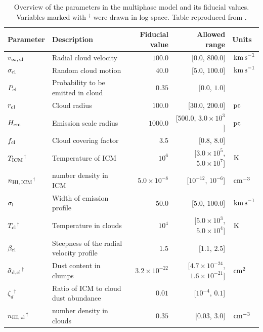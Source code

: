 \documentclass[a4,useAMS,usenatbib,usegraphicx]{mn2e}
\newcommand{\HI}{{\text{H\MakeUppercase{\romannumeral 1}}} }
\newcommand{\cm}{\ifmmode{{\rm cm}}\else cm\fi}
\begin{document}
\begin{table}
  \centering
\begin{tabular}{l|lrrl}
\hline
  Parameter  & Description & Fiducial value & Allowed range & Units \\ \hline\hline
$v_{\infty,\,{\rm cl}}$ & Radial cloud velocity & $100.0$ & [$0.0$, $800.0$] & $\,{\rm km\,s}^{-1}$ \\
$\sigma_{\rm {\rm cl}}$ & Random cloud motion &$40.0$ & [$5.0$, $100.0$] & $\,{\rm km\,s}^{-1}$ \\
$P_{\rm {\rm cl}}$ & Probability to be emitted in cloud & $0.35$ & [$0.0$, $1.0$] &  \\
$r_{\rm {\rm cl}}$ & Cloud radius & $100.0$ & [$30.0$, $200.0$] & $\,{\rm pc}$ \\
$H_{\rm em}$ & Emission scale radius & $1000.0$ & [$500.0$, $3.0\times 10^{3}$] & $\,{\rm pc}$ \\
$f_{\rm {\rm cl}}$ & Cloud covering factor & $3.5$ & [$0.8$, $8.0$] &  \\
$T_{\rm {\rm ICM}}$${}^{\dagger}$ & Temperature of ICM & $10^{6}$ & [$3.0\times 10^{5}$, $5.0\times 10^{7}$] & $\,{\rm K}$ \\
$n_{\rm HI,\,{\rm ICM}}$${}^{\dagger}$ & \HI number density in ICM & $5.0\times 10^{-8}$ & [$10^{-12}$, $10^{-6}$] & $\,{\rm cm}^{-3}$ \\
$\sigma_{\rm i}$ & Width of emission profile & $50.0$ & [$5.0$, $100.0$] & $\,{\rm km\,s}^{-1}$ \\
$T_{\rm {\rm cl}}$${}^{\dagger}$ & Temperature in clouds & $10^{4}$ & [$5.0\times 10^{3}$, $5.0\times 10^{4}$] & $\,{\rm K}$ \\
$\beta_{\rm cl}$ & Steepness of the radial velocity profile & $1.5$ & [$1.1$, $2.5$] &  \\
$\tilde\sigma_{\rm d, cl}$${}^{\dagger}$ & Dust content in clumps &
  $3.2\times10^{-22}$ & [$4.7\times 10^{-24}$, $1.6\times 10^{-21}$] &
  $\,\cm^{2}$ \\
$\zeta_d$${}^{\dagger}$ & Ratio of ICM to cloud dust abundance &
  $0.01$ & [$10^{-4}$, $0.1$] & \\
$n_{\rm HI,\,{\rm cl}}$${}^{\dagger}$ & \HI number density in
  clouds & $0.35$ & [$0.03$, $3.0$] & $\,{\rm cm}^{-3}$ \\
\hline
\end{tabular}
  \caption{Overview of the parameters in the multiphase model and its fiducial
    values. Variables marked with ${}^{\dagger}$ were drawn in
    log-space. Table reproduced from \citet{Gronke2016}.}
  \label{tab:models}
\end{table}
\end{document}
